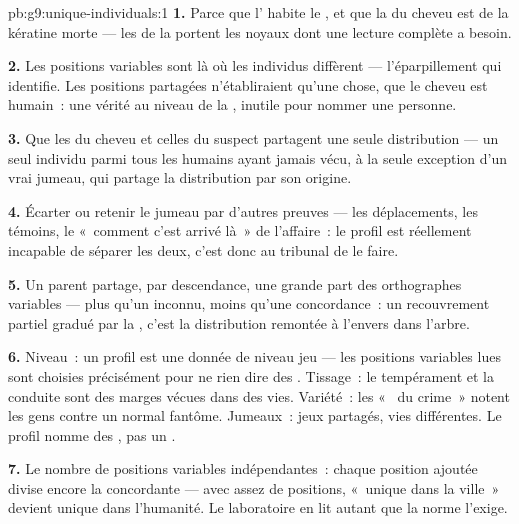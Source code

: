 \begin{solution}{pb:g9:unique-individuals:1}
\textbf{1.} Parce que l' habite le , et que la 
du cheveu est de la kératine morte --- les  de la
 portent les noyaux dont une lecture complète a besoin.

\textbf{2.} Les positions variables sont là où les individus
diffèrent --- l'éparpillement qui identifie. Les positions
partagées n'établiraient qu'une chose, que le cheveu est
humain~: une vérité au niveau de la , inutile pour
nommer une personne.

\textbf{3.} Que les  du cheveu et celles du suspect
partagent une seule distribution --- un seul individu parmi
tous les humains ayant jamais vécu, à la seule exception
d'un vrai jumeau, qui partage la distribution par son
origine.

\textbf{4.} Écarter ou retenir le jumeau par d'autres
preuves --- les déplacements, les témoins, le «~comment
c'est arrivé là~» de l'affaire~: le profil est réellement
incapable de séparer les deux, c'est donc au tribunal de le
faire.

\textbf{5.} Un parent partage, par descendance, une grande
part des orthographes variables --- plus qu'un inconnu,
moins qu'une concordance~: un recouvrement partiel gradué
par la , c'est la distribution remontée à l'envers
dans l'arbre.

\textbf{6.} Niveau~: un profil est une donnée de niveau
jeu --- les positions variables lues sont choisies
précisément pour ne rien dire des . Tissage~: le
tempérament et la conduite sont des marges vécues dans des
vies. Variété~: les «~ du crime~» notent les gens
contre un normal fantôme. Jumeaux~: jeux partagés, vies
différentes. Le profil nomme des , pas un .

\textbf{7.} Le nombre de positions variables indépendantes~:
chaque position ajoutée divise encore la 
concordante --- avec assez de positions, «~unique dans la
ville~» devient unique dans l'humanité. Le laboratoire en lit
autant que la norme l'exige.


\end{solution}
